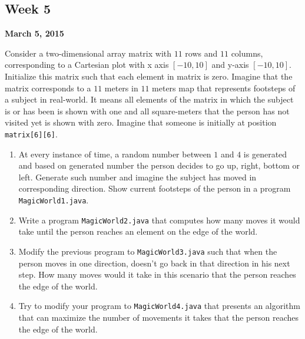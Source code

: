 \documentclass[12pt,letterpaper,twoside]{article}
\begin{document}




\subsection*{Week 5}
\hfill \textbf{March 5, 2015}

Consider a two-dimensional array matrix with $11$ rows and $11$ columns, corresponding to a Cartesian plot with x axis $[-10, 10]$ and y-axis $[-10, 10]$. Initialize this matrix such that each element in matrix is zero. Imagine that the matrix corresponds to a $11$ meters in $11$ meters map that represents footsteps of a subject in real-world. It means all elements of the matrix in which the subject is or has been is shown with one and all square-meters that the person has not visited yet is shown with zero. Imagine that someone is initially at position \texttt{matrix[6][6]}.
\begin{enumerate}[itemsep=0pt]
\item At every instance of time, a random number between $1$ and $4$ is generated and based on generated number the person decides to go up, right, bottom or left. Generate such number and imagine the subject has moved in corresponding direction. Show current footsteps of the person in a program \texttt{MagicWorld1.java}.
\item Write a program \texttt{MagicWorld2.java} that computes how many moves it would take until the person reaches an element on the edge of the world.
\item Modify the previous program to \texttt{MagicWorld3.java} such that when the person moves in one direction, doesn't go back in that direction in his next step. How many moves would it take in this scenario that the person reaches the edge of the world.
\item Try to modify your program to \texttt{MagicWorld4.java} that presents an algorithm that can maximize the number of movements it takes that the person reaches the edge of the world.
\end{enumerate}
\end{document}

